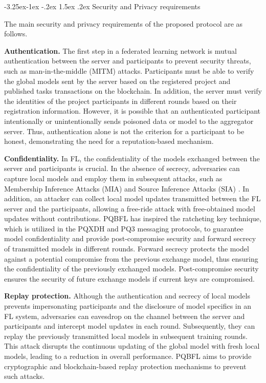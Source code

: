 \documentclass[a4paper,fleqn]{cas-dc}
\makeatletter
\renewcommand\subsection{\@startsection{subsection}{2}{\z@}%
   {-3.25ex\@plus -1ex \@minus -.2ex}%
   {1.5ex \@plus .2ex}%
   {\normalfont\large}} %
\makeatother
\begin{document}
\subsection{Security and Privacy requirements}
\label{Security and Privacy requirements}
 
The main security and privacy requirements of the proposed protocol are as follows.

\noindent\textbf{Authentication.}
The first step in a federated learning network is mutual authentication between the server and participants to prevent security threats, such as man-in-the-middle (MITM) attacks.
Participants must be able to verify the global models sent by the server based on the registered project and published tasks transactions on the blockchain.
In addition, the server must verify the identities of the project participants in different rounds based on their registration information. 
However, it is possible that an authenticated participant intentionally or unintentionally sends poisoned data or model to the aggregator server. 
Thus, authentication alone is not the criterion for a participant to be honest, demonstrating the need for a reputation-based mechanism.

\noindent\textbf{Confidentiality.}
In FL, the confidentiality of the models exchanged between the server and participants is crucial.
In the absence of secrecy, adversaries can capture local models and employ them in subsequent attacks, such as Membership Inference Attacks (MIA) \citep{MIA_attack} and Source Inference Attacks (SIA) \citep{SIA_attack}. 
In addition, an attacker can collect local model updates transmitted between the FL server and the participants, allowing a free-ride attack with free-obtained model updates without contributions. 
PQBFL has inspired the ratcheting key technique, which is utilized in the PQXDH \citep{Signal_pqxdh} and PQ3 \citep{Apple_pq3} messaging protocols, to guarantee model confidentiality and provide post-compromise security and forward secrecy of transmitted models in different rounds.
Forward secrecy protects the model against a potential compromise from the previous exchange model, thus ensuring the confidentiality of the previously exchanged models. 
Post-compromise security ensures the security of future exchange models if current keys are compromised.


\noindent\textbf{Replay protection.}
Although the authentication and secrecy of local models prevents impersonating participants and the disclosure of model specifics in an FL system, adversaries can eavesdrop on the channel between the server and participants and intercept model updates in each round. 
Subsequently, they can replay the previously transmitted local models in subsequent training rounds. 
This attack disrupts the continuous updating of the global model with fresh local models, leading to a reduction in overall performance. PQBFL aims to provide cryptographic and blockchain-based replay protection mechanisms to prevent such attacks.
\end{document}
